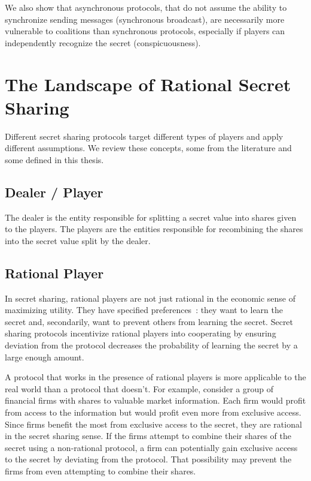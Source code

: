 \documentclass[12pt]{dalcsthesis}
\begin{document}
We also show that asynchronous protocols, that do not assume the ability to synchronize sending messages (synchronous broadcast), are necessarily more vulnerable to coalitions than synchronous protocols, especially if players can independently recognize the secret (conspicuousness).



\section{The Landscape of Rational Secret Sharing}

Different secret sharing protocols target different types of players and apply different assumptions. We review these concepts, some from the literature and some defined in this thesis.

\subsection{Dealer / Player}

The dealer is the entity responsible for splitting a secret value into shares given to the players. The players are the entities responsible for recombining the shares into the secret value split by the dealer.

\subsection{Rational Player}

In secret sharing, rational players are not just rational in the economic sense of maximizing utility. They have specified preferences~\cite{halpern04}: they want to learn the secret and, secondarily, want to prevent others from learning the secret. Secret sharing protocols incentivize rational players into cooperating by ensuring deviation from the protocol decreases the probability of learning the secret by a large enough amount.

A protocol that works in the presence of rational players is more applicable to the real world than a protocol that doesn't. For example, consider a group of financial firms with shares to valuable market information. Each firm would profit from access to the information but would profit even more from exclusive access. Since firms benefit the most from exclusive access to the secret, they are rational in the secret sharing sense. If the firms attempt to combine their shares of the secret using a non-rational protocol, a firm can potentially gain exclusive access to the secret by deviating from the protocol. That possibility may prevent the firms from even attempting to combine their shares.
\end{document}
